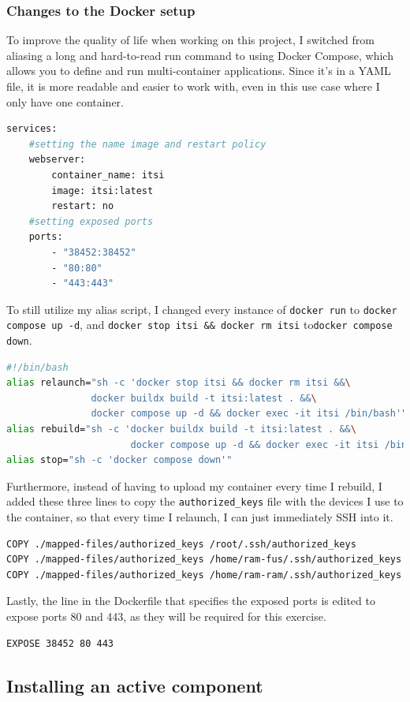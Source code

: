 \documentclass[a4paper]{article}
\newcommand{\abc}{\hfill \break}
\begin{document}
\subsubsection{Changes to the Docker setup}
To improve the quality of life when working on this project, I switched from aliasing a long and hard-to-read run command to using Docker Compose, which allows you to define and run multi-container applications. Since it's in a YAML file, it is more readable and easier to work with, even in this use case where I only have one container.\cite{Docker-Compose}
\begin{lstlisting}[language=bash]
services:
    #setting the name image and restart policy
    webserver:
        container_name: itsi
        image: itsi:latest
        restart: no
    #setting exposed ports
    ports:
        - "38452:38452"
        - "80:80"
        - "443:443"
\end{lstlisting}
To still utilize my alias script, I changed every instance of \texttt{docker run} to \texttt{docker compose up -d}, \abc and \texttt{docker stop itsi \&\& docker rm itsi} to\texttt{docker compose down}.
\begin{lstlisting}[language=bash]
#!/bin/bash
alias relaunch="sh -c 'docker stop itsi && docker rm itsi &&\
		       docker buildx build -t itsi:latest . &&\
		       docker compose up -d && docker exec -it itsi /bin/bash'"
alias rebuild="sh -c 'docker buildx build -t itsi:latest . &&\
                      docker compose up -d && docker exec -it itsi /bin/bash'"
alias stop="sh -c 'docker compose down'"
\end{lstlisting}
Furthermore, instead of having to upload my container every time I rebuild, I added these three lines to copy the \texttt{authorized\_keys} file with the devices I use to the container, so that every time I relaunch, I can just immediately SSH into it.
\begin{lstlisting}[language=bash]
COPY ./mapped-files/authorized_keys /root/.ssh/authorized_keys
COPY ./mapped-files/authorized_keys /home/ram-fus/.ssh/authorized_keys
COPY ./mapped-files/authorized_keys /home/ram-ram/.ssh/authorized_keys
\end{lstlisting}
Lastly, the line in the Dockerfile that specifies the exposed ports is edited to expose ports 80 and 443, as they will be required for this exercise.
\begin{lstlisting}[language=bash]
EXPOSE 38452 80 443
\end{lstlisting}
\newpage
\subsection{Installing an active component}
\end{document}
